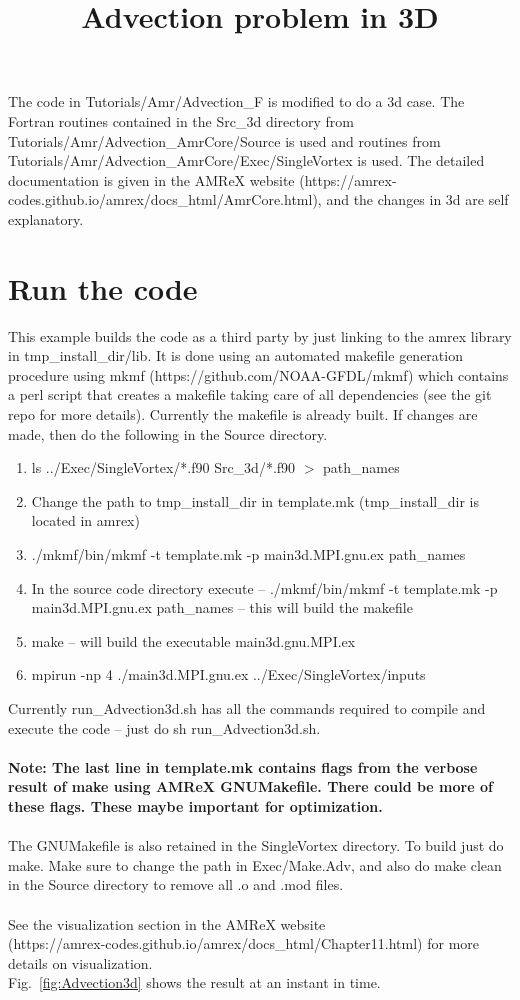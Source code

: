 \documentclass[]{article}
\title{Advection problem in 3D}
\begin{document}
\maketitle
The code in Tutorials/Amr/Advection\_F is modified to do a 3d case. The Fortran routines contained in the Src\_3d directory from Tutorials/Amr/Advection\_AmrCore/Source is used and routines from\\
Tutorials/Amr/Advection\_AmrCore/Exec/SingleVortex is used. The detailed documentation is given in the AMReX website (https://amrex-codes.github.io/amrex/docs\_html/AmrCore.html), and the changes in 3d are self explanatory.

\section{Run the code}
This example builds the code as a third party by just linking to the amrex library in tmp\_install\_dir/lib. It is done using an automated makefile generation procedure using mkmf (https://github.com/NOAA-GFDL/mkmf) which contains a perl script that creates a makefile taking care of all dependencies (see the git repo for more details). Currently the makefile is already built. If changes are made, then do the following in the Source directory.
\begin{enumerate}
\item ls ../Exec/SingleVortex/*.f90 Src\_3d/*.f90 $>$ path\_names
\item Change the path to tmp\_install\_dir in template.mk (tmp\_install\_dir is located in amrex)
\item ./mkmf/bin/mkmf -t template.mk -p main3d.MPI.gnu.ex path\_names
\item In the source code directory execute -- ./mkmf/bin/mkmf -t template.mk -p main3d.MPI.gnu.ex path\_names -- this will build the makefile
\item make -- will build the executable main3d.gnu.MPI.ex
\item mpirun -np 4 ./main3d.MPI.gnu.ex ../Exec/SingleVortex/inputs
\end{enumerate}
Currently run\_Advection3d.sh has all the commands required to compile and execute the code -- just do sh run\_Advection3d.sh.\\\\
\textbf{Note: The last line in template.mk contains flags from the verbose result of make using AMReX GNUMakefile. There could be more of these flags. These maybe important for optimization.}\\\\
The GNUMakefile is also retained in the SingleVortex directory. To build just do make. Make sure to change the path in Exec/Make.Adv, and also do make clean in the Source directory to remove all .o and .mod files.\\\\
See the visualization section in the AMReX website\\
(https://amrex-codes.github.io/amrex/docs\_html/Chapter11.html) for more details on visualization.\\
Fig.~\ref{fig:Advection3d} shows the result at an instant in time.
\end{document}
